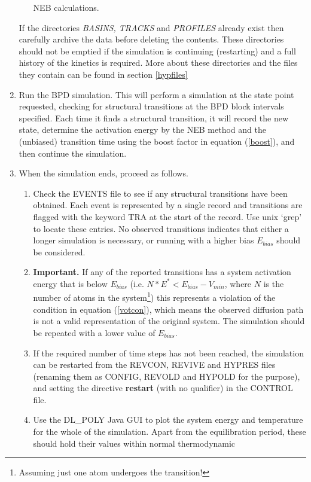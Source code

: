 \begin{enumerate}
\begin{itemize}
   NEB calculations.
\end{itemize}
   If the directories {\em BASINS, TRACKS} and {\em PROFILES} already
   exist then carefully archive the data before deleting the
   contents. These directories should not be emptied if the simulation
   is continuing (restarting) and a full history of the kinetics is
   required. More about these directories and the files they contain
   can be found in section \ref{hypfiles}
\item Run the BPD simulation. This will perform a simulation at the
   state point requested, checking for structural transitions at the
   BPD block intervals specified. Each time it finds a structural
   transition, it will record the new state, determine the activation
   energy by the NEB method and the (unbiased) transition time using
   the boost factor in equation (\ref{boost}), and then continue the
   simulation.
\item When the simulation ends, proceed as follows.
\begin{enumerate}
\item Check the EVENTS file to see if any structural
  transitions have been obtained. Each event is represented by a
  single record and transitions are flagged with the keyword TRA at
  the start of the record. Use unix `grep' to locate these entries. No
  observed transitions indicates that either a longer simulation is
  necessary, or running with a higher bias $E_{bias}$ should be
  considered.
\item {\bf Important.} If any of the reported transitions has a system
  activation energy that is below $E_{bias}$
  (i.e. $N*E^{*}<E_{bias}-V_{min}$, where $N$ is the number of atoms in the
  system\footnote{Assuming just one atom undergoes the transition!}) this
  represents a violation of the condition in equation (\ref{votcon}), which
  means the observed diffusion path is not a valid representation of the
  original system. The simulation should be repeated with a lower value of
  $E_{bias}$.
\item If the required number of time steps has not been reached, the
  simulation can be restarted from the REVCON, REVIVE and HYPRES files
  (renaming them as CONFIG, REVOLD and HYPOLD for the purpose), and
  setting the directive {\bf restart} (with no qualifier) in the CONTROL
  file.
\item Use the DL\_POLY Java GUI to plot the system energy and temperature
  for the whole of the simulation. Apart from the equilibration
  period, these should hold their values within normal thermodynamic

\end{enumerate}
\end{enumerate}
